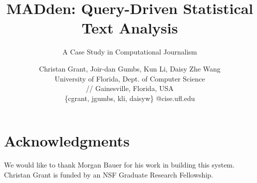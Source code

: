 \documentclass{vldb}
\newcommand{\system}{MADden\xspace}
\begin{document}
\title{\system: Query-Driven Statistical Text Analysis}
\subtitle{A Case Study in Computational Journalism}


\author{
    Christan Grant, Joir-dan Gumbs, Kun Li, Daisy Zhe Wang \\
    University of Florida, Dept. of Computer Science \\
//    Gainesville, Florida, USA \\
    \{cgrant, jgumbs, kli, daisyw\} @cise.ufl.edu
}




\maketitle







%





%
\section{Acknowledgments}
We would like to thank Morgan Bauer for his work in building this system.
Christan Grant is funded by an NSF Graduate Research Fellowship.


\begin{small}

\end{small}
\end{document}
